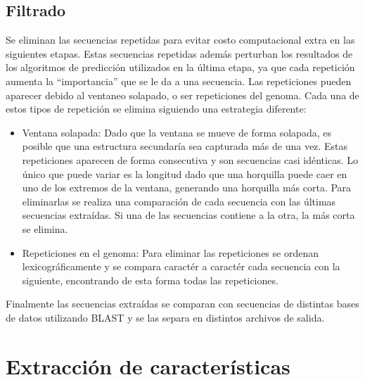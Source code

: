 \subsection{Filtrado}

Se eliminan las secuencias repetidas para evitar costo computacional extra en las siguientes etapas. Estas secuencias repetidas además perturban los
resultados de los algoritmos de predicción utilizados en la última etapa, ya que cada repetición aumenta la “importancia” que se le da a una secuencia.
Las repeticiones pueden aparecer debido al ventaneo solapado, o ser repeticiones del genoma. Cada una de estos tipos de repetición se elimina siguiendo una
estrategia diferente:

\begin{itemize}
	\item Ventana solapada: Dado que la ventana se mueve de forma solapada, es posible que una estructura secundaría sea capturada más de una vez. Estas
		repeticiones aparecen de forma consecutiva y son secuencias casi idénticas. Lo único que puede variar es la longitud dado que una horquilla
		puede caer en uno
		de los extremos de la ventana, generando una horquilla más corta. Para eliminarlas se realiza una comparación de cada secuencia con las
		últimas secuencias
		extraídas. Si una de las secuencias contiene a la otra, la más corta se elimina.
	\item Repeticiones en el genoma: Para eliminar las repeticiones se ordenan lexicográficamente y se compara caractér a caractér cada secuencia con la
		siguiente, encontrando de esta forma todas las repeticiones.
\end{itemize}

Finalmente las secuencias extraídas se comparan con secuencias de distintas bases de datos utilizando BLAST y se las separa en distintos archivos de salida.

\section{Extracción de características}

